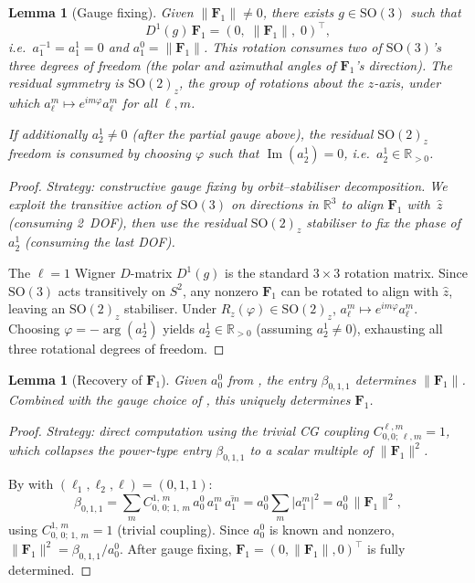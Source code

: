 \documentclass{article}
\theoremstyle{plain}
\newtheorem{lemma}[theorem]{Lemma}
\theoremstyle{definition}
\theoremstyle{remark}
\newcommand{\SO}{\mathrm{SO}}
\newcommand{\CG}[6]{C^{#5,\,#6}_{#1,\,#2;\,#3,\,#4}}
\newcommand{\abs}[1]{\lvert #1 \rvert}
\newcommand{\norm}[1]{\lVert #1 \rVert}
\newcommand{\R}{\mathbb{R}}
\newcommand{\conj}[1]{\overline{#1}}
\begin{document}
\begin{lemma}[Gauge fixing]\label{lem:gauge}
Given $\norm{\mathbf{F}_1} \ne 0$, there exists $g \in \SO(3)$ such
that
\begin{equation}\label{eq:gauge-F1}
  D^1(g)\,\mathbf{F}_1 = (0,\; \norm{\mathbf{F}_1},\; 0)^{\!\top},
\end{equation}
i.e.\ $a_1^{-1} = a_1^1 = 0$ and $a_1^0 = \norm{\mathbf{F}_1}$.
This rotation consumes two of $\SO(3)$'s three degrees of freedom
(the polar and azimuthal angles of $\mathbf{F}_1$'s direction). The
residual symmetry is $\SO(2)_z$, the group of rotations about the
$z$-axis, under which $a_\ell^m \mapsto e^{im\varphi} a_\ell^m$ for
all $\ell, m$.

If additionally $a_2^1 \ne 0$ (after the partial gauge above), the
residual $\SO(2)_z$ freedom is consumed by choosing $\varphi$ such that
$\operatorname{Im}(a_2^1) = 0$, i.e.\ $a_2^1 \in \R_{>0}$.
\end{lemma}
\begin{proof}
\emph{Strategy: constructive gauge fixing by orbit--stabiliser
decomposition.
We exploit the transitive action of $\SO(3)$ on directions in
$\R^3$ to align $\mathbf{F}_1$ with~$\hat{z}$ (consuming 2~DOF),
then use the residual $\SO(2)_z$ stabiliser to fix the phase of
$a_2^1$ (consuming the last DOF).}

The $\ell=1$ Wigner $D$-matrix $D^1(g)$ is the standard $3 \times 3$
rotation matrix. Since $\SO(3)$ acts transitively on $S^2$, any nonzero
$\mathbf{F}_1$ can be rotated to align with $\hat{z}$, leaving an
$\SO(2)_z$ stabiliser. Under $R_z(\varphi) \in \SO(2)_z$,
$a_\ell^m \mapsto e^{im\varphi} a_\ell^m$. Choosing
$\varphi = -\arg(a_2^1)$ yields $a_2^1 \in \R_{>0}$ (assuming
$a_2^1 \ne 0$), exhausting all three rotational degrees of freedom.
\end{proof}

\begin{lemma}[Recovery of $\mathbf{F}_1$]\label{lem:F1}
Given $a_0^0$ from , the entry $\beta_{0,1,1}$
determines $\norm{\mathbf{F}_1}$. Combined with the gauge choice
of , this uniquely determines $\mathbf{F}_1$.
\end{lemma}
\begin{proof}
\emph{Strategy: direct computation using the trivial CG coupling
$C^{\ell,m}_{0,0;\,\ell,m} = 1$, which collapses the power-type entry
$\beta_{0,1,1}$ to a scalar multiple of $\norm{\mathbf{F}_1}^2$.}

By  with $(\ell_1, \ell_2, \ell) = (0,1,1)$:
\[
  \beta_{0,1,1}
  = \sum_{m} \CG{0}{0}{1}{m}{1}{m}\,
    a_0^0\,a_1^m\,\conj{a_1^m}
  = a_0^0 \sum_{m} \abs{a_1^m}^2
  = a_0^0\,\norm{\mathbf{F}_1}^2,
\]
using $\CG{0}{0}{1}{m}{1}{m} = 1$ (trivial coupling). Since $a_0^0$
is known and nonzero, $\norm{\mathbf{F}_1}^2 = \beta_{0,1,1} / a_0^0$.
After gauge fixing, $\mathbf{F}_1 = (0, \norm{\mathbf{F}_1}, 0)^\top$
is fully determined.
\end{proof}
\end{document}
